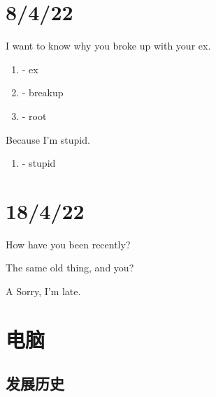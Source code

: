 \documentclass{article}
\begin{document}
\section*{8/4/22}

I want to know why you broke up with your ex.

\begin{enumerate}
    \item {} - ex
        \item {} - breakup
    \item {} - root
\end{enumerate}


Because I'm stupid.

\begin{enumerate}
    \item {} - stupid
\end{enumerate}

\section*{18/4/22}
How have you been recently?

The same old thing, and you?

A
Sorry, I'm late.
\xpinyin*{}
\xpinyin*{}
\section{电脑}
\subsection*{发展历史}
\\
\end{document}
